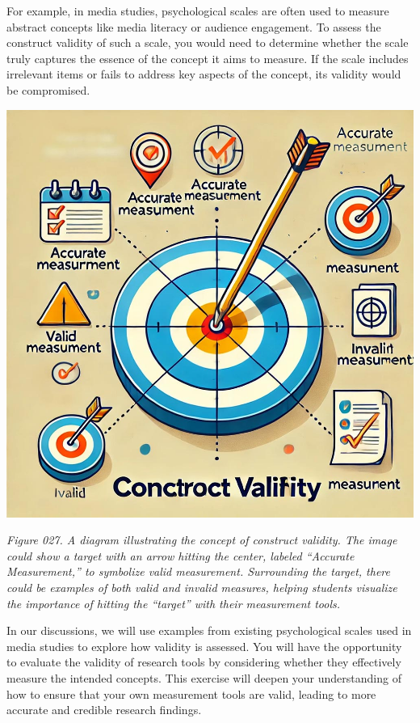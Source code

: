 \documentclass[
]{book}
\begin{document}
For example, in media studies, psychological scales are often used to measure abstract concepts like media literacy or audience engagement. To assess the construct validity of such a scale, you would need to determine whether the scale truly captures the essence of the concept it aims to measure. If the scale includes irrelevant items or fails to address key aspects of the concept, its validity would be compromised.

\includegraphics[width=1\linewidth,height=\textheight,keepaspectratio]{images/fig027.jpg}

\emph{Figure 027. A diagram illustrating the concept of construct validity. The image could show a target with an arrow hitting the center, labeled ``Accurate Measurement,'' to symbolize valid measurement. Surrounding the target, there could be examples of both valid and invalid measures, helping students visualize the importance of hitting the ``target'' with their measurement tools.}

In our discussions, we will use examples from existing psychological scales used in media studies to explore how validity is assessed. You will have the opportunity to evaluate the validity of research tools by considering whether they effectively measure the intended concepts. This exercise will deepen your understanding of how to ensure that your own measurement tools are valid, leading to more accurate and credible research findings.
\end{document}
